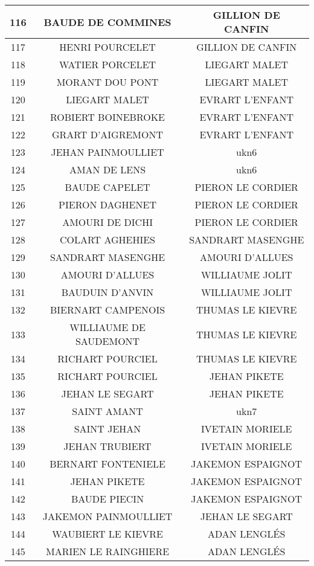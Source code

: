 \begin{center}
\begin{longtable}{|c|c|c|}
\hline	116	&	BAUDE DE COMMINES	&	GILLION DE CANFIN	\\
\hline	117	&	HENRI POURCELET	&	GILLION DE CANFIN	\\
\hline	118	&	WATIER PORCELET	&	LIEGART MALET	\\
\hline	119	&	MORANT DOU PONT	&	LIEGART MALET	\\
\hline	120	&	LIEGART MALET	&	EVRART L'ENFANT	\\
\hline	121	&	ROBIERT BOINEBROKE	&	EVRART L'ENFANT	\\
\hline	122	&	GRART D'AIGREMONT	&	EVRART L'ENFANT	\\
\hline	123	&	JEHAN PAINMOULLIET	&	ukn6	\\
\hline	124	&	AMAN DE LENS	&	ukn6	\\
\hline	125	&	BAUDE CAPELET	&	PIERON LE CORDIER	\\
\hline	126	&	PIERON DAGHENET	&	PIERON LE CORDIER	\\
\hline	127	&	AMOURI DE DICHI	&	PIERON LE CORDIER	\\
\hline	128	&	COLART AGHEHIES	&	SANDRART MASENGHE	\\
\hline	129	&	SANDRART MASENGHE	&	AMOURI D'ALLUES	\\
\hline	130	&	AMOURI D'ALLUES	&	WILLIAUME JOLIT	\\
\hline	131	&	BAUDUIN D'ANVIN	&	WILLIAUME JOLIT	\\
\hline	132	&	BIERNART CAMPENOIS	&	THUMAS LE KIEVRE	\\
\hline	133	&	WILLIAUME DE SAUDEMONT	&	THUMAS LE KIEVRE	\\
\hline	134	&	RICHART POURCIEL	&	THUMAS LE KIEVRE	\\
\hline	135	&	RICHART POURCIEL	&	JEHAN PIKETE	\\
\hline	136	&	JEHAN LE SEGART	&	JEHAN PIKETE	\\
\hline	137	&	SAINT AMANT	&	ukn7	\\
\hline	138	&	SAINT JEHAN	&	IVETAIN MORIELE	\\
\hline	139	&	JEHAN TRUBIERT	&	IVETAIN MORIELE	\\
\hline	140	&	BERNART FONTENIELE	&	JAKEMON ESPAIGNOT	\\
\hline	141	&	JEHAN PIKETE	&	JAKEMON ESPAIGNOT	\\
\hline	142	&	BAUDE PIECIN	&	JAKEMON ESPAIGNOT	\\
\hline	143	&	JAKEMON PAINMOULLIET	&	JEHAN LE SEGART	\\
\hline	144	&	WAUBIERT LE KIEVRE	&	ADAN LENGLÉS	\\
\hline	145	&	MARIEN LE RAINGHIERE	&	ADAN LENGLÉS	\\

\end{longtable}
\end{center}

